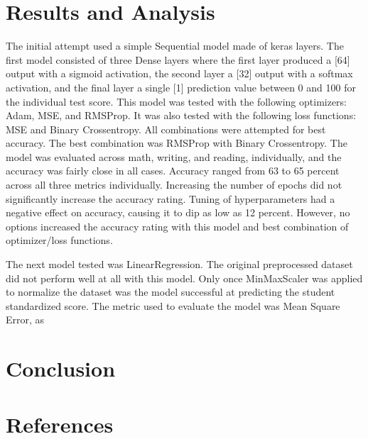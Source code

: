 \documentclass[man,12pt]{apa6} %
\begin{document}
\section{Results and Analysis}
The initial attempt used a simple Sequential model made of keras layers. The first model consisted of three Dense layers where the first layer produced a [64]  output with a sigmoid activation, the second layer a [32] output with a softmax activation, and the final layer a single [1] prediction value between 0 and 100 for the individual test score.  This model was tested with the following optimizers: Adam, MSE, and RMSProp. It was also tested with the following loss functions: MSE and Binary Crossentropy. All combinations were attempted for best accuracy. The best combination was RMSProp with Binary Crossentropy. The model was evaluated across math, writing, and reading, individually, and the accuracy was fairly close in all cases. Accuracy ranged from 63 to 65 percent across all three metrics individually.  Increasing the number of epochs did not significantly increase the accuracy rating.  Tuning of hyperparameters had a negative effect on accuracy, causing it to dip as low as 12 percent.  However, no options increased the accuracy rating with this model and best combination of optimizer/loss functions.

The next model tested was LinearRegression. The original preprocessed dataset did not perform well at all with this model. Only once MinMaxScaler was applied to normalize the dataset was the model successful at predicting the student standardized score. The metric used to evaluate the model was Mean Square Error, as 


\section{Conclusion}

\section{References}
\end{document}
